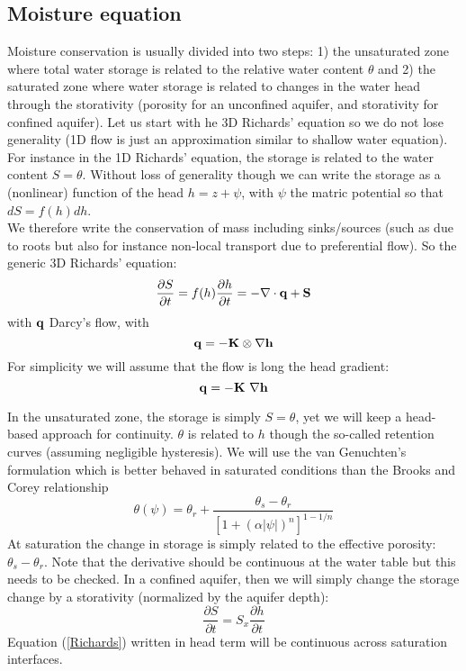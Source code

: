 \documentclass{article}
\begin{document}
\subsection{Moisture equation}
Moisture conservation is usually divided into two steps: 1) the unsaturated zone where total water storage is related to the relative water content $\theta$ and 2) the saturated zone where water storage is related to changes in the water head through the storativity (porosity for an unconfined aquifer, and storativity for confined aquifer).
Let us start with he 3D Richards' equation so we do not lose generality (1D flow is just an approximation similar to shallow water equation).
For instance in the 1D Richards' equation, the storage is related to the water content $S=\theta$. Without loss of generality though we can write the storage as a (nonlinear) function of the head $h=z+\psi$, with $\psi$ the matric potential so that $dS = f(h)dh$. \\
We therefore write the conservation of mass including sinks/sources (such as due to roots but also for instance non-local transport due to preferential flow). 
So the generic 3D Richards' equation:
\begin{equation}
     \frac{\partial S}{\partial t} = f(h)\frac{\partial h}{\partial t} = -\nabla \cdot \bf{q} + S
\label{Richards}
\end{equation}
with $\bf{q}$ Darcy's flow, with 
\begin{equation}
     \bf{q} = - \mathbf{K} \otimes \nabla h
\end{equation}
For simplicity we will assume that the flow is long the head gradient:
\begin{equation}
     \bf{q} = - K \ \nabla h
\end{equation}

In the unsaturated zone, the storage is simply $S=\theta$, yet we will keep a head-based approach for continuity. $\theta$ is related to $h$ though the so-called retention curves (assuming negligible hysteresis). We will use the van Genuchten's formulation which is better behaved in saturated conditions than the Brooks and Corey relationship 
\begin{equation}
     \theta(\psi) = \theta_r + \frac{\theta_s - \theta_r}{\left[ 1+(\alpha |\psi|)^n \right]^{1-1/n}}
\end{equation}
At saturation the change in storage is simply related to the effective porosity: $\theta_s - \theta_r$. Note that the derivative should be continuous at the water table but this needs to be checked. 
In a confined aquifer, then we will simply change the storage change by a storativity (normalized by the aquifer depth):
\begin{equation}
     \frac{\partial S}{\partial t} = S_x \frac{\partial h}{\partial t}
\end{equation}
Equation (\ref{Richards}) written in head term will be continuous across saturation interfaces.
\end{document}
